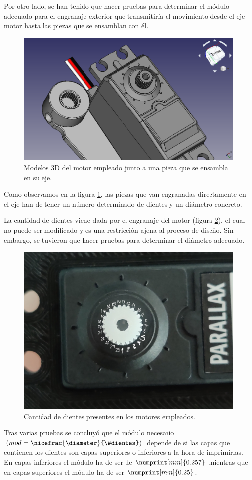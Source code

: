 Por otro lado, se han tenido que hacer pruebas para determinar el módulo adecuado para el engranaje exterior que transmitiría el movimiento desde el eje motor hasta las piezas que se ensamblan con él.

\begin{figure}[H]
    \centering
    \includegraphics[width=.7\linewidth]{pictures/ComparativaEngranajes.png}
    \caption{Modelos 3D del motor empleado junto a una pieza que se ensambla en su eje.}
    \label{fig:comparativa_engranajes}
\end{figure}

Como observamos en la figura \ref{fig:comparativa_engranajes}, las piezas que van engranadas directamente en el eje han de tener un número determinado de dientes y un diámetro concreto.

La cantidad de dientes viene dada por el engranaje del motor (figura \ref{fig:motor_teeth_count}), el cual no puede ser modificado y es una restricción ajena al proceso de diseño. Sin embargo, se tuvieron que hacer pruebas para determinar el diámetro adecuado.

\begin{figure}[H]
    \centering
    \includegraphics[width=.5\linewidth]{pictures/motor_teeth.jpg}
    \caption{Cantidad de dientes presentes en los motores empleados.}
    \label{fig:motor_teeth_count}
\end{figure}

Tras varias pruebas se concluyó que el módulo necesario 
$\left(mod = \nicefrac{\diameter}{\#dientes}\right)$ depende de si las capas que contienen 
los dientes son capas superiores o inferiores a la hora de imprimirlas.
En capas inferiores el módulo ha de ser de $\numprint[mm]{0.257}$ mientras que en
capas superiores el módulo ha de ser $\numprint[mm]{0.25}$.

